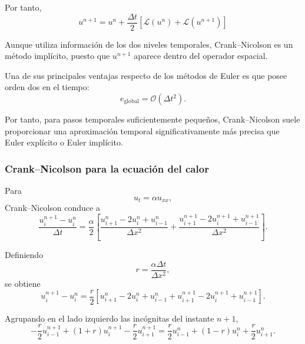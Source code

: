 \documentclass[12pt]{article}
\begin{document}
Por tanto,
\begin{equation}
    \boxed{
    u^{n+1}
    =
    u^n
    +
    \frac{\Delta t}{2}
    \left[
        \mathcal{L}(u^n)
        +
        \mathcal{L}(u^{n+1})
    \right]
    }
\end{equation}

Aunque utiliza información de los dos niveles temporales, Crank--Nicolson es un método implícito, puesto que $u^{n+1}$ aparece dentro del operador espacial.

Una de sus principales ventajas respecto de los métodos de Euler es que posee orden dos en el tiempo:
\begin{equation}
    e_{\mathrm{global}}
    =
    \mathcal{O}(\Delta t^2).
\end{equation}

Por tanto, para pasos temporales suficientemente pequeños, Crank--Nicolson suele proporcionar una aproximación temporal significativamente más precisa que Euler explícito o Euler implícito.

\subsubsection*{Crank--Nicolson para la ecuación del calor}

Para
\begin{equation}
    u_t
    =
    \alpha u_{xx},
\end{equation}
Crank--Nicolson conduce a
\begin{equation}
    \frac{u_i^{n+1}-u_i^n}{\Delta t}
    =
    \frac{\alpha}{2}
    \left[
        \frac{
            u_{i+1}^{n}
            -
            2u_i^{n}
            +
            u_{i-1}^{n}
        }{\Delta x^2}
        +
        \frac{
            u_{i+1}^{n+1}
            -
            2u_i^{n+1}
            +
            u_{i-1}^{n+1}
        }{\Delta x^2}
    \right].
\end{equation}

Definiendo
\begin{equation}
    r
    =
    \frac{\alpha\Delta t}{\Delta x^2},
\end{equation}
se obtiene
\begin{equation}
    u_i^{n+1}-u_i^n
    =
    \frac{r}{2}
    \left[
        u_{i+1}^n
        -
        2u_i^n
        +
        u_{i-1}^n
        +
        u_{i+1}^{n+1}
        -
        2u_i^{n+1}
        +
        u_{i-1}^{n+1}
    \right].
\end{equation}

Agrupando en el lado izquierdo las incógnitas del instante $n+1$,
\begin{equation}
    -\frac{r}{2}u_{i-1}^{n+1}
    +
    (1+r)u_i^{n+1}
    -
    \frac{r}{2}u_{i+1}^{n+1}
    =
    \frac{r}{2}u_{i-1}^{n}
    +
    (1-r)u_i^{n}
    +
    \frac{r}{2}u_{i+1}^{n}.
\end{equation}
\end{document}
